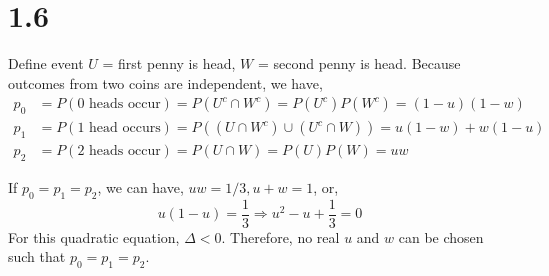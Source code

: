 \documentclass[letterpaper]{article}
\begin{document}

    \section*{1.6}
    Define event $U$ = {first penny is head}, $W$ = {second penny is head}. 
    Because outcomes from two coins are independent, we have,
    \begin{align*}
    p_0 & = P(\text{0 heads occur}) = P(U^c \cap W^c) = P(U^c)P(W^c) = (1-u)(1-w) \\
    p_1 & = P(\text{1 head occurs}) = P((U \cap W^c) \cup (U^c \cap W)) = u(1-w) + w(1-u) \\
    p_2 & = P(\text{2 heads occur}) = P(U \cap W) = P(U)P(W) = uw
    \end{align*}

    If $p_0 = p_1 = p_2$, we can have, $uw = 1/3, u + w = 1$, or,
    \[ u(1-u) = \frac{1}{3} \Rightarrow u^2 - u + \frac{1}{3} = 0 \]
    For this quadratic equation, $\Delta < 0$. Therefore, no real $u$ and $w$ can be chosen such that $p_0 = p_1 = p_2$.
\end{document}
